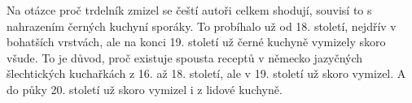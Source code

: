 Na otázce proč trdelník zmizel se čeští autoři celkem shodují, souvisí to s nahrazením černých kuchyní sporáky. To probíhalo už od 18. století, nejdřív v bohatších vrstvách, ale na konci 19. století už černé kuchyně vymizely skoro všude. To je důvod, proč existuje spousta receptů v německo jazyčných šlechtických kuchařkách z 16. až 18. století, ale v 19. století už skoro vymizel. A do půky 20. století už skoro vymizel i z lidové kuchyně. 
